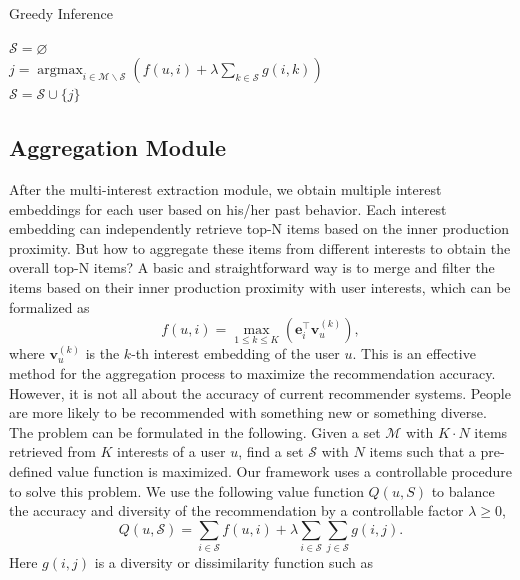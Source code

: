 \begin{algorithm}[t]
	\caption{Greedy Inference \label{algo:greedy_infer}}
	$\mathcal{S} = \varnothing$ \\
     {
        $j = \operatorname{argmax}_{i \in \mathcal{M} \backslash \mathcal{S}} \left( f(u, i) + \lambda \sum_{k \in \mathcal{S}} g(i,k) \right)$ \\
        $\mathcal{S} = \mathcal{S} \cup \{j\}$
    }
\end{algorithm}

\subsection{Aggregation Module}
After the multi-interest extraction module, we obtain multiple interest embeddings for each user based on his/her past behavior. Each interest embedding can independently retrieve top-N items based on the inner production proximity. But how to aggregate these items from different interests to obtain the overall top-N items? A basic and straightforward way is to merge and filter the items based on their inner production proximity with user interests, which can be formalized as
\begin{equation}
    f(u,i) = \max_{1\leq k\leq K}(\mathbf{e}_i^\top \mathbf{v}_u^{(k)}),
\end{equation}
where $\mathbf{v}_u^{(k)}$ is the $k$-th interest embedding of the user $u$. This is an effective method for the aggregation process to maximize the recommendation accuracy. However, it is not all about the accuracy of current recommender systems. People are more likely to be recommended with something new or something diverse. 
The problem can be formulated in the following. Given a set $\mathcal{M}$ with $K\cdot N$ items retrieved from $K$ interests of a user $u$, find a set $\mathcal{S}$ with $N$ items such that a pre-defined value function is maximized. Our framework uses a controllable procedure to solve this problem. We use the following value function $Q(u,S)$ to balance the accuracy and diversity of the recommendation by a controllable factor $\lambda \geq 0$,
\begin{equation}
    Q(u,\mathcal{S}) = \sum_{i\in \mathcal{S}} f(u,i) + \lambda \sum_{i\in \mathcal{S}} \sum_{j\in \mathcal{S}} g(i,j).
\end{equation}
\noindent Here $g(i,j)$ is a diversity or dissimilarity function such as
